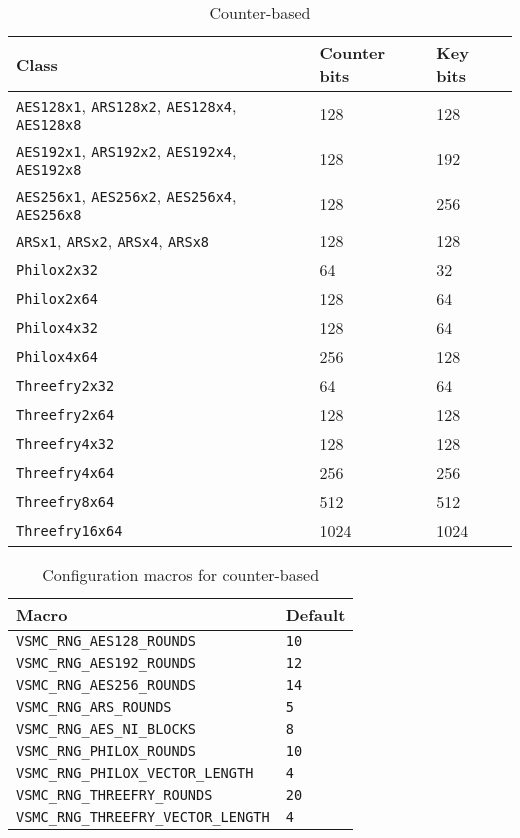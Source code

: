 \begin{table}
  \tbfigures
  \begin{tabularx}{\textwidth}{p{3in}LL}
    \toprule
    Class & Counter bits & Key bits \\
    \midrule
    \verb|AES128x1|, \verb|ARS128x2|, \verb|AES128x4|, \verb|AES128x8|
    & 128 & 128 \\
    \verb|AES192x1|, \verb|ARS192x2|, \verb|AES192x4|, \verb|AES192x8|
    & 128 & 192 \\
    \verb|AES256x1|, \verb|AES256x2|, \verb|AES256x4|, \verb|AES256x8|
    & 128 & 256 \\
    \verb|ARSx1|, \verb|ARSx2|, \verb|ARSx4|, \verb|ARSx8| & 128 & 128 \\
    \verb|Philox2x32|    & 64   & 32   \\
    \verb|Philox2x64|    & 128  & 64   \\
    \verb|Philox4x32|    & 128  & 64   \\
    \verb|Philox4x64|    & 256  & 128  \\
    \verb|Threefry2x32|  & 64   & 64   \\
    \verb|Threefry2x64|  & 128  & 128  \\
    \verb|Threefry4x32|  & 128  & 128  \\
    \verb|Threefry4x64|  & 256  & 256  \\
    \verb|Threefry8x64|  & 512  & 512  \\
    \verb|Threefry16x64| & 1024 & 1024 \\
    \bottomrule
  \end{tabularx}
  \caption{Counter-based \protect\rng}
  \label{tab:Counter-based RNG}
\end{table}

\begin{table}
  \begin{tabularx}{\textwidth}{LL}
    \toprule
    Macro & Default \\
    \midrule
    \verb|VSMC_RNG_AES128_ROUNDS|          & \verb|10| \\
    \verb|VSMC_RNG_AES192_ROUNDS|          & \verb|12| \\
    \verb|VSMC_RNG_AES256_ROUNDS|          & \verb|14| \\
    \verb|VSMC_RNG_ARS_ROUNDS|             & \verb|5|  \\
    \verb|VSMC_RNG_AES_NI_BLOCKS|          & \verb|8|  \\
    \verb|VSMC_RNG_PHILOX_ROUNDS|          & \verb|10| \\
    \verb|VSMC_RNG_PHILOX_VECTOR_LENGTH|   & \verb|4|  \\
    \verb|VSMC_RNG_THREEFRY_ROUNDS|        & \verb|20| \\
    \verb|VSMC_RNG_THREEFRY_VECTOR_LENGTH| & \verb|4|  \\
    \bottomrule
  \end{tabularx}
  \caption{Configuration macros for counter-based \protect\rng}
  \label{tab:Configuration macros for counter-based RNG}
\end{table}

